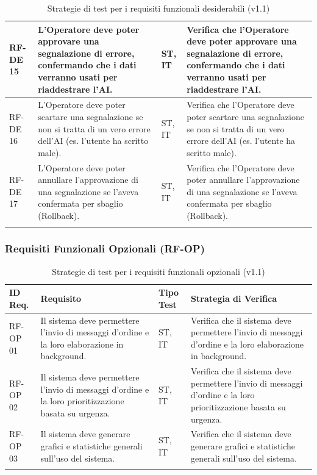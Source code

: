 \documentclass[a4paper,11pt,oneside]{scrartcl}
\begin{document}
\begin{longtable}{|p{1.5cm}|p{5.5cm}|p{1.8cm}|p{5cm}|}
    RF-DE 15         & L'Operatore deve poter approvare una segnalazione di errore, confermando che i dati verranno usati per riaddestrare l'AI.               & ST, IT             & Verifica che l'Operatore deve poter approvare una segnalazione di errore, confermando che i dati verranno usati per riaddestrare l'AI.               \\ \hline
    RF-DE 16         & L'Operatore deve poter scartare una segnalazione se non si tratta di un vero errore dell'AI (es. l'utente ha scritto male).             & ST, IT             & Verifica che l'Operatore deve poter scartare una segnalazione se non si tratta di un vero errore dell'AI (es. l'utente ha scritto male).             \\ \hline
    RF-DE 17         & L'Operatore deve poter annullare l'approvazione di una segnalazione se l'aveva confermata per sbaglio (Rollback).                       & ST, IT             & Verifica che l'Operatore deve poter annullare l'approvazione di una segnalazione se l'aveva confermata per sbaglio (Rollback).                       \\ \hline
    \caption{Strategie di test per i requisiti funzionali desiderabili (v1.1)}
\end{longtable}

\newpage
\subsubsection{Requisiti Funzionali Opzionali (RF-OP)}

\begin{longtable}{|p{1.5cm}|p{5.5cm}|p{1.8cm}|p{5cm}|}
    \hline
    \textbf{ID Req.} & \textbf{Requisito}                                                                                    & \textbf{Tipo Test} & \textbf{Strategia di Verifica}                                                                                     \\
    \hline
    RF-OP 01         & Il sistema deve permettere l'invio di messaggi d'ordine e la loro elaborazione in background.         & ST, IT             & Verifica che il sistema deve permettere l'invio di messaggi d'ordine e la loro elaborazione in background.         \\ \hline
    RF-OP 02         & Il sistema deve permettere l'invio di messaggi d'ordine e la loro prioritizzazione basata su urgenza. & ST, IT             & Verifica che il sistema deve permettere l'invio di messaggi d'ordine e la loro prioritizzazione basata su urgenza. \\ \hline
    RF-OP 03         & Il sistema deve generare grafici e statistiche generali sull'uso del sistema.                         & ST, IT             & Verifica che il sistema deve generare grafici e statistiche generali sull'uso del sistema.                         \\ \hline
    \caption{Strategie di test per i requisiti funzionali opzionali (v1.1)}
\end{longtable}
\end{document}

